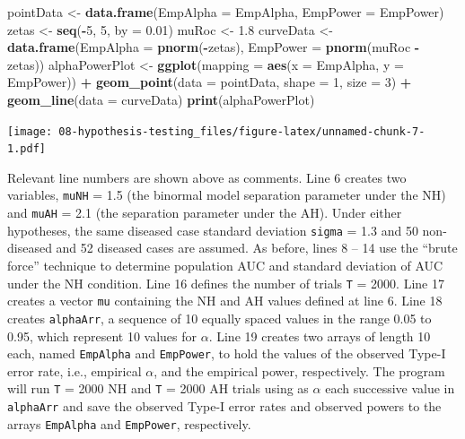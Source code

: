 \documentclass[
]{book}
\newenvironment{Shaded}{\begin{snugshade}}{\end{snugshade}}
\newcommand{\DataTypeTok}[1]{\textcolor[rgb]{0.13,0.29,0.53}{#1}}
\newcommand{\DecValTok}[1]{\textcolor[rgb]{0.00,0.00,0.81}{#1}}
\newcommand{\FloatTok}[1]{\textcolor[rgb]{0.00,0.00,0.81}{#1}}
\newcommand{\KeywordTok}[1]{\textcolor[rgb]{0.13,0.29,0.53}{\textbf{#1}}}
\newcommand{\NormalTok}[1]{#1}
\newcommand{\OperatorTok}[1]{\textcolor[rgb]{0.81,0.36,0.00}{\textbf{#1}}}
\newcommand{\StringTok}[1]{\textcolor[rgb]{0.31,0.60,0.02}{#1}}
\begin{document}
\begin{Shaded}
\begin{Highlighting}[]
\NormalTok{pointData <-}\StringTok{ }\KeywordTok{data.frame}\NormalTok{(}\DataTypeTok{EmpAlpha =}\NormalTok{ EmpAlpha, }\DataTypeTok{EmpPower =}\NormalTok{ EmpPower)}
\NormalTok{zetas <-}\StringTok{ }\KeywordTok{seq}\NormalTok{(}\OperatorTok{-}\DecValTok{5}\NormalTok{, }\DecValTok{5}\NormalTok{, }\DataTypeTok{by =} \FloatTok{0.01}\NormalTok{)}
\NormalTok{muRoc <-}\StringTok{ }\FloatTok{1.8}
\NormalTok{curveData <-}\StringTok{ }\KeywordTok{data.frame}\NormalTok{(}\DataTypeTok{EmpAlpha =} \KeywordTok{pnorm}\NormalTok{(}\OperatorTok{-}\NormalTok{zetas),}
  \DataTypeTok{EmpPower =} \KeywordTok{pnorm}\NormalTok{(muRoc }\OperatorTok{-}\StringTok{ }\NormalTok{zetas))}
\NormalTok{alphaPowerPlot <-}\StringTok{ }\KeywordTok{ggplot}\NormalTok{(}\DataTypeTok{mapping =} \KeywordTok{aes}\NormalTok{(}\DataTypeTok{x =}\NormalTok{ EmpAlpha, }\DataTypeTok{y =}\NormalTok{ EmpPower)) }\OperatorTok{+}\StringTok{ }
\StringTok{  }\KeywordTok{geom_point}\NormalTok{(}\DataTypeTok{data =}\NormalTok{ pointData, }\DataTypeTok{shape =} \DecValTok{1}\NormalTok{, }\DataTypeTok{size =} \DecValTok{3}\NormalTok{) }\OperatorTok{+}\StringTok{ }
\StringTok{  }\KeywordTok{geom_line}\NormalTok{(}\DataTypeTok{data =}\NormalTok{ curveData)}
\KeywordTok{print}\NormalTok{(alphaPowerPlot)}
\end{Highlighting}
\end{Shaded}

\texttt{[image: 08-hypothesis-testing\_files/figure-latex/unnamed-chunk-7-1.pdf]}

Relevant line numbers are shown above as comments. Line 6 creates two variables, \texttt{muNH} = 1.5 (the binormal model separation parameter under the NH) and \texttt{muAH} = 2.1 (the separation parameter under the AH). Under either hypotheses, the same diseased case standard deviation \texttt{sigma} = 1.3 and 50 non-diseased and 52 diseased cases are assumed. As before, lines 8 -- 14 use the ``brute force'' technique to determine population AUC and standard deviation of AUC under the NH condition. Line 16 defines the number of trials \texttt{T} = 2000. Line 17 creates a vector \texttt{mu} containing the NH and AH values defined at line 6. Line 18 creates \texttt{alphaArr}, a sequence of 10 equally spaced values in the range 0.05 to 0.95, which represent 10 values for \(\alpha\). Line 19 creates two arrays of length 10 each, named \texttt{EmpAlpha} and \texttt{EmpPower}, to hold the values of the observed Type-I error rate, i.e., empirical \(\alpha\), and the empirical power, respectively. The program will run \texttt{T} = 2000 NH and \texttt{T} = 2000 AH trials using as \(\alpha\) each successive value in \texttt{alphaArr} and save the observed Type-I error rates and observed powers to the arrays \texttt{EmpAlpha} and \texttt{EmpPower}, respectively.
\end{document}
